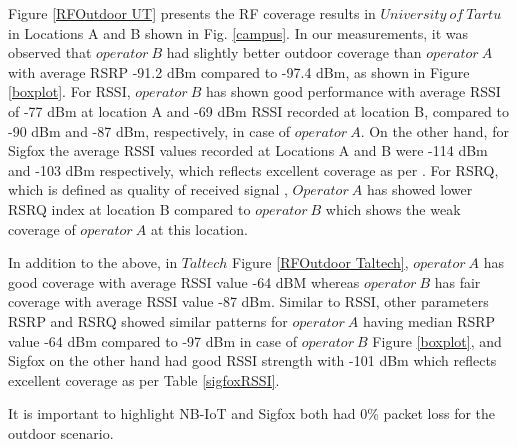\documentclass[conference,a4paper,xcolor=table]{IEEEtran}
\begin{document}
 Figure \ref{RFOutdoor UT} presents the RF coverage results  in $University\ of\  Tartu$ in Locations A and B shown in Fig. \ref{campus}. In our measurements, it was observed that $operator\ B$ had slightly better outdoor coverage than $operator\ A $ with average RSRP -91.2 dBm compared to -97.4 dBm, as shown in Figure \ref{boxplot}. For RSSI, $operator\ B$ has shown good performance with average RSSI of -77 dBm at location A and -69 dBm RSSI recorded at location B, compared to -90 dBm and -87 dBm, respectively, in case of $operator\ A$. On the other hand, for Sigfox the average RSSI values recorded at Locations A and B were -114 dBm and -103 dBm respectively, which reflects excellent coverage as per \cite{sigfoxRSSI}. For RSRQ, which is defined as quality of received signal \cite{3GPP}, $Operator\ A$ has showed lower RSRQ index at location B compared to $operator\ B$ which shows the weak coverage of $operator\ A$ at this location.\par

In addition to the above, in $Taltech$ Figure \ref{RFOutdoor Taltech}, $operator\ A$ has good coverage with average RSSI value -64 dBM whereas $operator\ B$ has fair coverage with average RSSI value -87 dBm. Similar to RSSI, other parameters RSRP and RSRQ showed similar patterns for $operator\ A$ having median RSRP value -64 dBm compared to -97 dBm in case of $operator\ B$ Figure \ref{boxplot}, and Sigfox on the other hand had good RSSI strength with -101 dBm which reflects excellent coverage as per Table \ref{sigfoxRSSI}.\par
It is important to highlight NB-IoT and Sigfox both had 0\% packet loss for the outdoor scenario.
\end{document}
